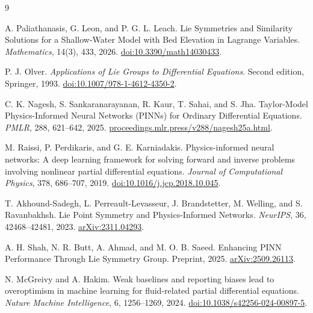 \begin{thebibliography}{9}
\raggedright
\setlength{\itemsep}{3pt}
\setlength{\parskip}{0pt}
A. Paliathanasis, G. Leon, and P. G. L. Leach.
Lie Symmetries and Similarity Solutions for a Shallow-Water Model with Bed Elevation in Lagrange Variables.
\emph{Mathematics}, 14(3), 433, 2026.
\href{https://doi.org/10.3390/math14030433}{doi:10.3390/math14030433}.

P. J. Olver. \emph{Applications of Lie Groups to Differential Equations}.
Second edition, Springer, 1993.
\href{https://doi.org/10.1007/978-1-4612-4350-2}{doi:10.1007/978-1-4612-4350-2}.

C. K. Nagesh, S. Sankaranarayanan, R. Kaur, T. Sahai, and S. Jha.
Taylor-Model Physics-Informed Neural Networks (PINNs) for Ordinary Differential Equations.
\emph{PMLR}, 288, 621--642, 2025.
\href{https://proceedings.mlr.press/v288/nagesh25a.html}{proceedings.mlr.press/v288/nagesh25a.html}.

M. Raissi, P. Perdikaris, and G. E. Karniadakis.
Physics-informed neural networks: A deep learning framework for solving forward and inverse problems involving nonlinear partial differential equations.
\emph{Journal of Computational Physics}, 378, 686--707, 2019.
\href{https://doi.org/10.1016/j.jcp.2018.10.045}{doi:10.1016/j.jcp.2018.10.045}.

T. Akhound-Sadegh, L. Perreault-Levasseur, J. Brandstetter, M. Welling, and S. Ravanbakhsh.
Lie Point Symmetry and Physics-Informed Networks.
\emph{NeurIPS}, 36, 42468--42481, 2023.
\href{https://arxiv.org/abs/2311.04293}{arXiv:2311.04293}.

A. H. Shah, N. R. Butt, A. Ahmad, and M. O. B. Saeed.
Enhancing PINN Performance Through Lie Symmetry Group.
Preprint, 2025.
\href{https://arxiv.org/abs/2509.26113}{arXiv:2509.26113}.

N. McGreivy and A. Hakim.
Weak baselines and reporting biases lead to overoptimism in machine learning for fluid-related partial differential equations.
\emph{Nature Machine Intelligence}, 6, 1256--1269, 2024.
\href{https://doi.org/10.1038/s42256-024-00897-5}{doi:10.1038/s42256-024-00897-5}.
\end{thebibliography}
